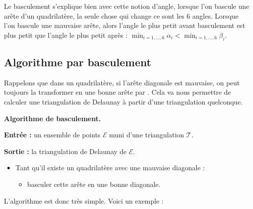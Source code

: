 \documentclass[11pt,class=report,crop=false]{standalone}
\begin{document}
Le basculement s'explique bien avec cette notion d'angle, lorsque l'on bascule une arête d'un quadrilatère, la seule chose qui change ce sont les $6$ angles.
Lorsque l'on bascule une mauvaise arête, alors l'angle le plus petit avant basculement est plus petit que l'angle le plus petit après :
$\min_{i=1,\ldots,6} \alpha_i < \min_{i=1,\ldots,6} \beta_i$.




\subsection{Algorithme par basculement}

Rappelons que dans un quadrilatère, si l'arête diagonale est mauvaise, on peut toujours la transformer en une bonne arête par . Cela va nous permettre de calculer une triangulation de Delaunay à partir d'une triangulation quelconque.



\begin{algorithme}
\textbf{Algorithme de basculement.}

\textbf{Entrée :} un ensemble de points $\mathcal{E}$ muni d'une triangulation $\mathcal{T}$.

\textbf{Sortie :} la triangulation de Delaunay de $\mathcal{E}$.

\begin{itemize}
	\item Tant qu'il existe un quadrilatère avec une mauvaise diagonale :
	\begin{itemize}
		\item basculer cette arête en une bonne diagonale.
	\end{itemize} 
\end{itemize}	  	
\end{algorithme}
	
\bigskip



L'algorithme est donc très simple. Voici un exemple :

\end{document}
